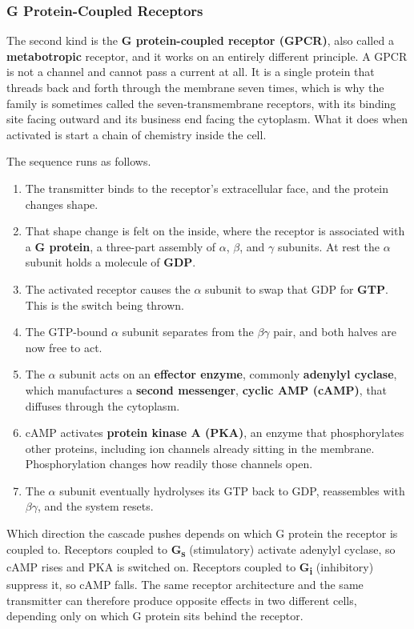 \documentclass[11pt]{article}
\begin{document}
\subsubsection{G Protein-Coupled Receptors}

The second kind is the \textbf{G protein-coupled receptor (GPCR)}, also called a \textbf{metabotropic} receptor, and it works on an entirely different principle. A GPCR is not a channel and cannot pass a current at all. It is a single protein that threads back and forth through the membrane seven times, which is why the family is sometimes called the seven-transmembrane receptors, with its binding site facing outward and its business end facing the cytoplasm. What it does when activated is start a chain of chemistry inside the cell.

The sequence runs as follows.

\begin{enumerate}
    \item The transmitter binds to the receptor's extracellular face, and the protein changes shape.
    \item That shape change is felt on the inside, where the receptor is associated with a \textbf{G protein}, a three-part assembly of $\alpha$, $\beta$, and $\gamma$ subunits. At rest the $\alpha$ subunit holds a molecule of \textbf{GDP}.
    \item The activated receptor causes the $\alpha$ subunit to swap that GDP for \textbf{GTP}. This is the switch being thrown.
    \item The GTP-bound $\alpha$ subunit separates from the $\beta\gamma$ pair, and both halves are now free to act.
    \item The $\alpha$ subunit acts on an \textbf{effector enzyme}, commonly \textbf{adenylyl cyclase}, which manufactures a \textbf{second messenger}, \textbf{cyclic AMP (cAMP)}, that diffuses through the cytoplasm.
    \item cAMP activates \textbf{protein kinase A (PKA)}, an enzyme that phosphorylates other proteins, including ion channels already sitting in the membrane. Phosphorylation changes how readily those channels open.
    \item The $\alpha$ subunit eventually hydrolyses its GTP back to GDP, reassembles with $\beta\gamma$, and the system resets.
\end{enumerate}

Which direction the cascade pushes depends on which G protein the receptor is coupled to. Receptors coupled to \textbf{G\textsubscript{s}} (stimulatory) activate adenylyl cyclase, so cAMP rises and PKA is switched on. Receptors coupled to \textbf{G\textsubscript{i}} (inhibitory) suppress it, so cAMP falls. The same receptor architecture and the same transmitter can therefore produce opposite effects in two different cells, depending only on which G protein sits behind the receptor.
\end{document}
